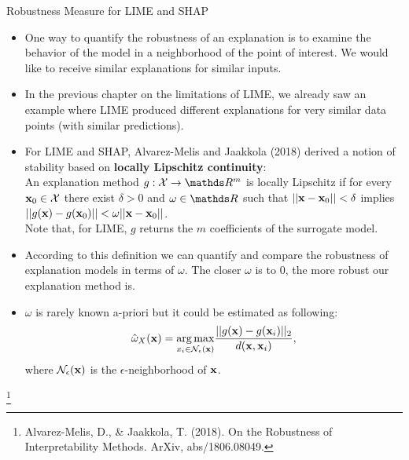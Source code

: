 \documentclass[11pt,compress,t,notes=noshow, aspectratio=169, xcolor=table]{beamer}
\begin{document}
\begin{vbframe}{Robustness Measure for LIME and SHAP}  
	\begin{itemize}
		\item One way to quantify the robustness of an explanation is to examine the behavior of the model in a neighborhood of the point of interest. We would like to receive similar explanations for similar inputs. 
		\item In the previous chapter on the limitations of LIME, we already saw an example where LIME produced different explanations for very similar data points (with similar predictions).
		\item For LIME and SHAP, Alvarez-Melis and Jaakkola (2018) derived a notion of stability based on \textbf{locally Lipschitz continuity}: \\
		An explanation method $g:\Xspace \rightarrow \R^m$ is locally Lipschitz if for every $\mathbf{x}_0 \in \mathcal{X}$ there exist $\delta > 0$ and $\omega \in \R$ such that $||\mathbf{x} - \mathbf{x}_0|| < \delta$ implies $||g(\mathbf{x}) - g(\mathbf{x}_0)|| < \omega ||\mathbf{x} - \mathbf{x}_0||$. \\
		\footnotesize Note that, for LIME, $g$ returns the $m$ coefficients of the surrogate model. \normalsize
		\item According to this definition we can quantify and compare the robustness of explanation models in terms of $\omega$. 
		The closer $\omega$ is to 0, the more robust our explanation method is. 
		\item $\omega$ is rarely known a-priori but it could be estimated as following: 
		$$\hat{\omega}_{X}(\mathbf{x}) = \underset{x_i \in \mathcal{N}_{\epsilon}(\mathbf{x})}{\arg \max} \frac{||g(\mathbf{x}) - g(\mathbf{x}_i)||_2}{d(\mathbf{x}, \mathbf{x}_i)},$$
		where $\mathcal{N}_{\epsilon}(\mathbf{x})$ is the $\epsilon$-neighborhood of $\mathbf{x}$.
	\end{itemize}
\vspace{2cm}
\footnote[frame]{Alvarez-Melis, D., \& Jaakkola, T. (2018). On the Robustness of Interpretability Methods. ArXiv, abs/1806.08049.}
\end{vbframe}


\begin{comment}
\begin{vbframe}{Sources of Uncertainty}
Two sources of uncertainty could be identified for local explanation methods: 
\begin{itemize}
\item Sampling variance in explaining a single data point. 
E.g., to train a surrogate model for LIME we sample a new data set.   
\item Sensitivity to choice of parameters. E.g., the user needs to determine the sample size and the kernel width to explain a model with LIME. 
\end{itemize}
These sources could lead to different explanations although we analyse the same model and the same (or a very similar) data point. 
\footnote[frame]{Zhang et al. (2019). ``Why Should You Trust My Explanation?'' Understanding Uncertainty in LIME Explanations. arXiv preprint arXiv:1904.12991.} 
\end{vbframe}
\end{comment}
\end{document}
